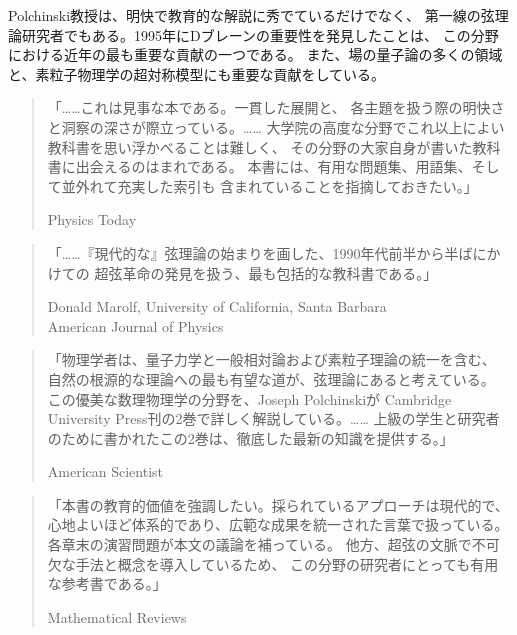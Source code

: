Polchinski教授は、明快で教育的な解説に秀でているだけでなく、
第一線の弦理論研究者でもある。1995年にDブレーンの重要性を発見したことは、
この分野における近年の最も重要な貢献の一つである。
また、場の量子論の多くの領域と、素粒子物理学の超対称模型にも重要な貢献をしている。

\clearpage
{}
\begin{quote}
「……これは見事な本である。一貫した展開と、
各主題を扱う際の明快さと洞察の深さが際立っている。……
大学院の高度な分野でこれ以上によい教科書を思い浮かべることは難しく、
その分野の大家自身が書いた教科書に出会えるのはまれである。
本書には、有用な問題集、用語集、そして並外れて充実した索引も
含まれていることを指摘しておきたい。」
\begin{flushright}Physics Today\end{flushright}
\end{quote}

\begin{quote}
「……『現代的な』弦理論の始まりを画した、1990年代前半から半ばにかけての
超弦革命の発見を扱う、最も包括的な教科書である。」
\begin{flushright}
Donald Marolf, University of California, Santa Barbara\\
American Journal of Physics
\end{flushright}
\end{quote}

\begin{quote}
「物理学者は、量子力学と一般相対論および素粒子理論の統一を含む、
自然の根源的な理論への最も有望な道が、弦理論にあると考えている。
この優美な数理物理学の分野を、Joseph Polchinskiが
Cambridge University Press刊の2巻で詳しく解説している。……
上級の学生と研究者のために書かれたこの2巻は、徹底した最新の知識を提供する。」
\begin{flushright}American Scientist\end{flushright}
\end{quote}

\begin{quote}
「本書の教育的価値を強調したい。採られているアプローチは現代的で、
心地よいほど体系的であり、広範な成果を統一された言葉で扱っている。
各章末の演習問題が本文の議論を補っている。
他方、超弦の文脈で不可欠な手法と概念を導入しているため、
この分野の研究者にとっても有用な参考書である。」
\begin{flushright}Mathematical Reviews\end{flushright}
\end{quote}

